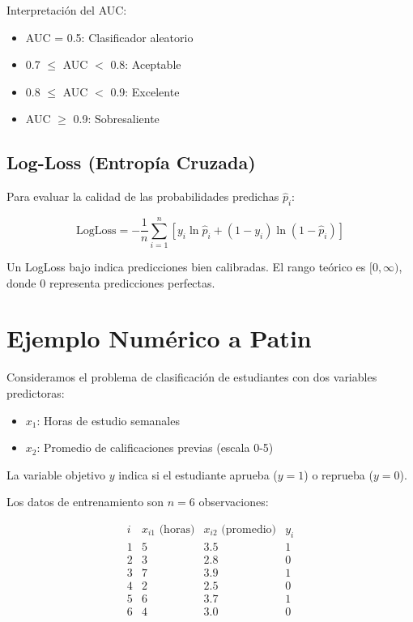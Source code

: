 \documentclass[12pt]{article}
\begin{document}
Interpretación del AUC:
\begin{itemize}
\item AUC = 0.5: Clasificador aleatorio
\item 0.7 $\leq$ AUC $<$ 0.8: Aceptable
\item 0.8 $\leq$ AUC $<$ 0.9: Excelente
\item AUC $\geq$ 0.9: Sobresaliente
\end{itemize}

\subsection{Log-Loss (Entropía Cruzada)}

Para evaluar la calidad de las probabilidades predichas $\hat{p}_i$:

\[
\text{LogLoss} = -\frac{1}{n}\sum_{i=1}^n \left[ y_i \ln \hat{p}_i + (1-y_i) \ln(1-\hat{p}_i) \right]
\]

Un LogLoss bajo indica predicciones bien calibradas. El rango teórico es $[0, \infty)$, donde $0$ representa predicciones perfectas.



\section{Ejemplo Numérico a Patin}



Consideramos el problema de clasificación de estudiantes con dos variables predictoras:

\begin{itemize}
\item $x_1$: Horas de estudio semanales
\item $x_2$: Promedio de calificaciones previas (escala 0-5)
\end{itemize}

La variable objetivo $y$ indica si el estudiante aprueba ($y=1$) o reprueba ($y=0$).

Los datos de entrenamiento son $n=6$ observaciones:

\[
\begin{array}{c|c|c|c}
i & x_{i1} \text{ (horas)} & x_{i2} \text{ (promedio)} & y_i \\
\hline
1 & 5 & 3.5 & 1 \\
2 & 3 & 2.8 & 0 \\
3 & 7 & 3.9 & 1 \\
4 & 2 & 2.5 & 0 \\
5 & 6 & 3.7 & 1 \\
6 & 4 & 3.0 & 0 \\
\end{array}
\]
\end{document}

